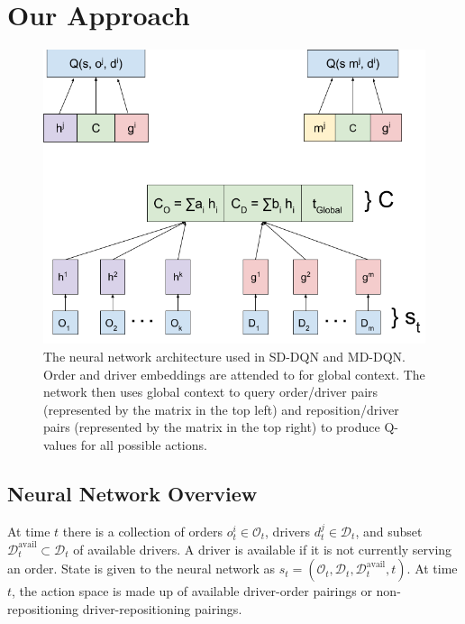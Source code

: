\section{Our Approach}

\begin{figure}
\begin{floatrow}
\centering

\includegraphics[width=.9\linewidth]{sections/mddqn/figures/Improved_Dispatch_Q-learning_2_.png}
\caption{The neural network architecture used in SD-DQN and MD-DQN. Order and driver embeddings are attended to for global context. The network then uses global context to query order/driver pairs (represented by the matrix in the top left) and reposition/driver pairs (represented by the matrix in the top right) to produce Q-values for all possible actions.}
\label{Figure:network}
\end{floatrow}
\end{figure}

\subsection{Neural Network Overview}

At time $t$ there is a collection of orders $o_t^i \in \mathcal{O}_t$, drivers $d^j_t \in \mathcal{D}_t$, and subset $\mathcal{D}^{\mathrm{avail}}_t \subset \mathcal{D}_t$ of available drivers. A driver is available if it is not currently serving an order. State is given to the neural network as $s_t = (\mathcal{O}_t, \mathcal{D}_t, \mathcal{D}^{\mathrm{avail}}_t, t)$. At time $t$, the action space is made up of available driver-order pairings or non-repositioning driver-repositioning pairings.

